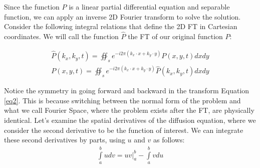 Since the function $P$ is a linear partial differential equation and separable function, we can apply an inverse 2D Fourier transform to solve the solution. Consider the following integral relations that define the 2D FT in Cartesian coordinates. We will call the function $\hat{P}$ the FT of our original function $P$:

\begin{align*}  
  \hat{P}(k_x,k_y,t) =  \oiint_{s} e^{-i 2\pi (k_x \cdot x + k_y \cdot y )} P(x,y,t) dx dy \\  
  P(x,y,t) = \oiint_{s} e^{-i 2\pi (k_x \cdot x + k_y \cdot y )} \hat{P}(k_x,k_y,t) dx dy \tag{2}
  \label{eq2}  
\end{align*}  

Notice the symmetry in going forward and backward in the transform Equation \eqref{eq2}. This is because switching between the normal form of the problem and what we call Fourier Space, where the problem exists after the FT, are physically identical. Let’s examine the spatial derivatives of the diffusion equation, where we consider the second derivative to be the function of interest. We can integrate these second derivatives by parts, using $u$ and $v$ as follows:
\begin{align*}  
\int\limits_{a}^{b} udv = uv \bigg \vert^{b}_{a} - \int\limits_{a}^{b} vdu 
\label{ibp1}  
\end{align*} 
